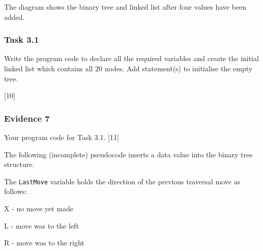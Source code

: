 The diagram shows the binary tree and linked list after four values
have been added.

\subsubsection*{Task 3.1}

Write the program code to declare all the required variables and create
the initial linked list which contains all 20 nodes. Add statement(s)
to initialise the empty tree.

\hfill{}{[}10{]}

\subsubsection*{Evidence 7}

Your program code for Task 3.1. {[}11{]}

The following (incomplete) pseudocode inserts a data value into the
binary tree structure.

The \texttt{LastMove} variable holds the direction of the previous
traversal move as follows:

X - no move yet made 

L - move was to the left 

R - move was to the right

